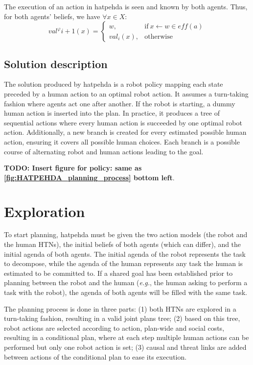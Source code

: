 The execution of an action in \acrshort{hatpehda} is seen and known by both agents. Thus, for both agents' beliefs, we have $\forall x \in X$: 
\begin{equation}
    val^\varphi{i+1}(x) = \left\{ 
    \begin{array}{ll}
        w, & \mbox{if} ~ x \leftarrow w \in \textit{eff}(a)   \\ 
        val_i(x), & \mbox{otherwise}
    \end{array}\right.
\end{equation}


\subsection*{Solution description}

The solution produced by \acrshort{hatpehda} is a robot policy mapping each state preceded by a human action to an optimal robot action. It assumes a turn-taking fashion where agents act one after another. If the robot is starting, a dummy human action is inserted into the plan. In practice, it produces a tree of sequential actions where every human action is succeeded by one optimal robot action. Additionally, a new branch is created for every estimated possible human action, ensuring it covers all possible human choices. Each branch is a possible course of alternating robot and human actions leading to the goal.

\textbf{TODO: Insert figure for policy: same as \ref{fig:HATPEHDA_planning_process} bottom left}.


\section{Exploration}

To start planning, \acrshort{hatpehda} must be given the two action models (the robot and the human HTNs), the initial beliefs of both agents (which can differ), and the initial agenda of both agents. The initial agenda of the robot represents the task to decompose, while the agenda of the human represents any task the human is estimated to be committed to. If a shared goal has been established prior to planning between the robot and the human (\textit{e.g.}, the human asking to perform a task with the robot), the agenda of both agents will be filled with the same task.

The planning process is done in three parts: (1) both HTNs are explored in a turn-taking fashion, resulting in a valid joint plans tree; (2) based on this tree, robot actions are selected according to action, plan-wide and social costs, resulting in a conditional plan, where at each step multiple human actions can be performed but only one robot action is set; (3) causal and threat links are added between actions of the conditional plan to ease its execution.

